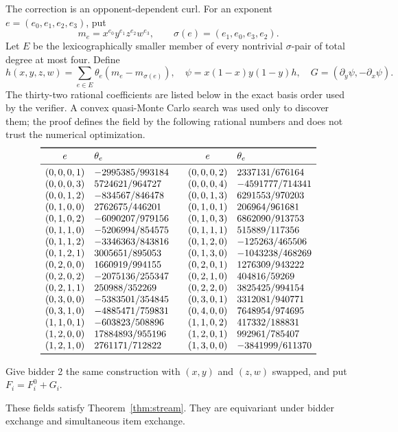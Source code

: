 The correction is an opponent-dependent curl.  For an exponent
\(e=(e_0,e_1,e_2,e_3)\), put
\[
m_e=x^{e_0}y^{e_1}z^{e_2}w^{e_3},\qquad
\sigma(e)=(e_1,e_0,e_3,e_2).
\]
Let \(E\) be the lexicographically smaller member of every nontrivial
\(\sigma\)-pair of total degree at most four.  Define
\[
h(x,y,z,w)=\sum_{e\in E}\theta_e(m_e-m_{\sigma(e)}),
\quad
\psi=x(1-x)y(1-y)h,
\quad
G=(\partial_y\psi,-\partial_x\psi).
\]
The thirty-two rational coefficients are listed below in the exact basis
order used by the verifier.  A convex quasi-Monte Carlo search was used only
to discover them; the proof defines the field by the following rational
numbers and does not trust the numerical optimization.
\[
\begin{array}{cl@{\qquad}cl}
\toprule
e&\theta_e&e&\theta_e\\
\midrule
(0,0,0,1)&-2995385/993184&(0,0,0,2)&2337131/676164\\
(0,0,0,3)&5724621/964727&(0,0,0,4)&-4591777/714341\\
(0,0,1,2)&-834567/846478&(0,0,1,3)&6291553/970203\\
(0,1,0,0)&2762675/446201&(0,1,0,1)&206964/961681\\
(0,1,0,2)&-6090207/979156&(0,1,0,3)&6862090/913753\\
(0,1,1,0)&-5206994/854575&(0,1,1,1)&515889/117356\\
(0,1,1,2)&-3346363/843816&(0,1,2,0)&-125263/465506\\
(0,1,2,1)&3005651/895053&(0,1,3,0)&-1043238/468269\\
(0,2,0,0)&1660919/994155&(0,2,0,1)&1276309/943222\\
(0,2,0,2)&-2075136/255347&(0,2,1,0)&404816/59269\\
(0,2,1,1)&250988/352269&(0,2,2,0)&3825425/994154\\
(0,3,0,0)&-5383501/354845&(0,3,0,1)&3312081/940771\\
(0,3,1,0)&-4885471/759831&(0,4,0,0)&7648954/974695\\
(1,1,0,1)&-603823/508896&(1,1,0,2)&417332/188831\\
(1,2,0,0)&17884893/955196&(1,2,0,1)&992961/785407\\
(1,2,1,0)&2761171/712822&(1,3,0,0)&-3841999/611370\\
\bottomrule
\end{array}
\]

Give bidder 2 the same construction with \((x,y)\) and \((z,w)\) swapped,
and put \(F_i=F_i^0+G_i\).

\begin{lemma}\label{lem:witness}
These fields satisfy Theorem~\ref{thm:stream}.  They are equivariant under
bidder exchange and simultaneous item exchange.
\end{lemma}

